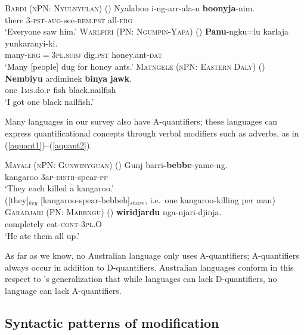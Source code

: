 \documentclass[12pt,egregdoesnotlikesansseriftitles]{scrartcl}
\begin{document}
\begin{exe}
  \ex\label{allerg} \textsc{Bardi (nPN: Nyulnyulan)} (\citealt[272]{bowern12})
  \gll Nyalaboo i-ng-arr-ala-n \textbf{boonyja}-nim.\\
  there 3-\textsc{pst}-\textsc{aug}-see-\textsc{rem.pst} all-\textsc{erg}\\
  \glt `Everyone saw him.'
  \ex \textsc{Warlpiri (PN: Ngumpin-Yapa)} (\citealt[6]{bowler17})
  \gll \textbf{Panu}-ngku=lu karlaja yunkaranyi-ki.\\
  many-\textsc{erg}$=$\textsc{3pl.subj} dig.\textsc{pst} honey.ant-\textsc{dat}\\
  \glt `Many [people] dug for honey ants.' \label{agrmarking1}
  \ex \textsc{Matngele (nPN: Eastern Daly)} (\citealt[54]{zandvoort99})
  \gll \textbf{Nembiyu} ardiminek \textbf{binya} \textbf{jawk}.\\
  one 1\textsc{ms.}do.\textsc{p} fish black.nailfish\\
  \glt `I got one black nailfish.'  \label{discconst}
\end{exe}


Many languages in our survey also have A-quantifiers; these languages can express quantificational concepts through verbal modifiers such as adverbs, as in (\ref{aquant1})--(\ref{aquant2}).


\begin{exe}
  \ex \textsc{Mayali (nPN: Gunwinyguan)} (\citealt[221]{evans95})
  \gll Gunj barri\textbf{-bebbe}-yame-ng.\\
  kangaroo 3a\textsc{p-distr}-spear-\textsc{pp}\\
  \glt `They each killed a kangaroo.'\\
  ([they]$_{key}$ [kangaroo-spear-bebbeh]$_{share}$, i.e.\ one kangaroo-killing per man) \label{aquant1}
  \ex  \textsc{Garadjari (PN: Marrngu)} (\citealt[54]{sands89})
  \gll \textbf{wiridjardu}  nga-njari-djinja.\\
  completely  eat-\textsc{cont}-3\textsc{pl.O}\\
  \glt `He ate them all up.' \label{aquant2}
\end{exe}

As far as we know, no Australian language only uses A-quantifiers; A-quantifiers always  occur in addition to D-quantifiers. Australian languages conform in this respect to \cite{bachetal95}'s generalization that while languages can lack D-quantifiers, no language can lack A-quantifiers.

\subsection{Syntactic patterns of modification}
\end{document}
